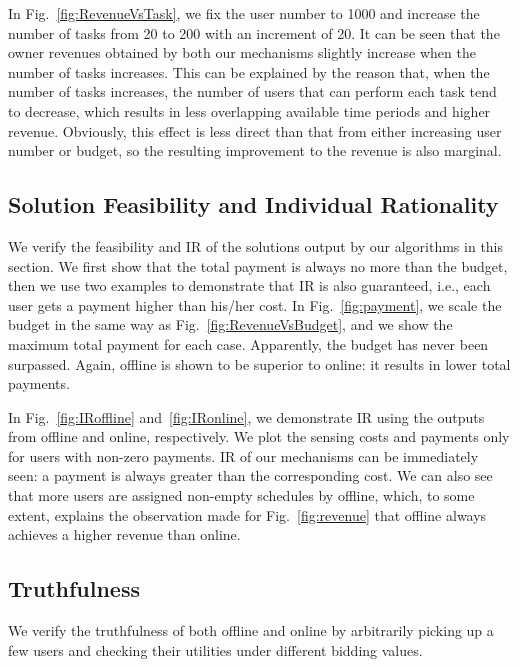 \documentclass[10pt,journal,compsoc]{IEEEtran}
\begin{document}
    In Fig.~\ref{fig:RevenueVsTask}, we fix the user number to 1000 and increase the number of tasks from 20 to 200 with an increment of 20. It can be seen that the owner revenues obtained by both our mechanisms slightly increase when the number of tasks increases. This can be explained by the reason that, when the number of tasks increases, the number of users that can perform each task tend to decrease, which results in less overlapping available time periods and higher revenue. Obviously, this effect is less direct than that from either increasing user number or budget, so the resulting improvement to the revenue is also marginal.

  \subsection{Solution Feasibility and Individual Rationality}
We verify the feasibility and IR of the solutions output by our algorithms in this section. We first show that the total payment is always no more than the budget, then we use two examples to demonstrate that IR is also guaranteed, i.e., each user gets a payment higher than his/her cost. In Fig.~\ref{fig:payment}, we scale the budget in the same way as Fig.~\ref{fig:RevenueVsBudget}, and we show the maximum total payment for each case. Apparently, the budget has never been surpassed. Again, \textsf{offline} is shown to be superior to \textsf{online}: it results in lower total payments.

    In Fig.~\ref{fig:IRoffline} and~\ref{fig:IRonline}, we demonstrate IR using the outputs from \textsf{offline} and \textsf{online}, respectively. We plot the sensing costs and payments only for users with non-zero payments. IR of our mechanisms can be immediately seen: a payment is always greater than the corresponding cost. We can also see that more users are assigned non-empty schedules by \textsf{offline}, which, to some extent, explains the observation made for Fig.~\ref{fig:revenue} that \textsf{offline} always achieves a higher revenue than \textsf{online}.

  \subsection{Truthfulness}
We verify the truthfulness of both \textsf{offline} and \textsf{online} by arbitrarily picking up a few users and checking their utilities under different bidding values.
\end{document}
